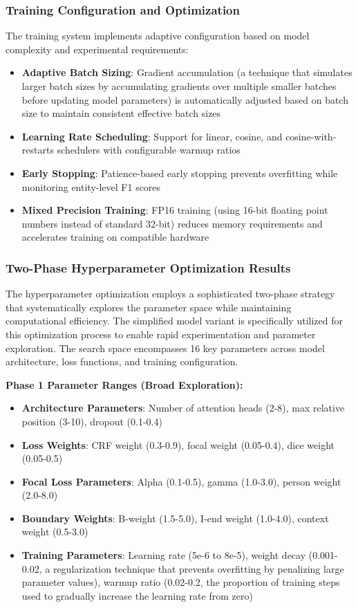 \documentclass[a4paper]{usiinfbachelorproject}
\begin{document}
\subsubsection{Training Configuration and Optimization}

The training system implements adaptive configuration based on model complexity and experimental requirements:

\begin{itemize}
    \item \textbf{Adaptive Batch Sizing}: Gradient accumulation (a technique that simulates larger batch sizes by accumulating gradients over multiple smaller batches before updating model parameters) is automatically adjusted based on batch size to maintain consistent effective batch sizes
    \item \textbf{Learning Rate Scheduling}: Support for linear, cosine, and cosine-with-restarts schedulers with configurable warmup ratios
    \item \textbf{Early Stopping}: Patience-based early stopping prevents overfitting while monitoring entity-level F1 scores
    \item \textbf{Mixed Precision Training}: FP16 training (using 16-bit floating point numbers instead of standard 32-bit) reduces memory requirements and accelerates training on compatible hardware
\end{itemize}
\subsubsection{Two-Phase Hyperparameter Optimization Results}

The hyperparameter optimization employs a sophisticated two-phase strategy that systematically explores the parameter space while maintaining computational efficiency. The simplified model variant is specifically utilized for this optimization process to enable rapid experimentation and parameter exploration. The search space encompasses 16 key parameters across model architecture, loss functions, and training configuration.

\textbf{Phase 1 Parameter Ranges (Broad Exploration):}
\begin{itemize}
    \item \textbf{Architecture Parameters}: Number of attention heads (2-8), max relative position (3-10), dropout (0.1-0.4)
    \item \textbf{Loss Weights}: CRF weight (0.3-0.9), focal weight (0.05-0.4), dice weight (0.05-0.5)
    \item \textbf{Focal Loss Parameters}: Alpha (0.1-0.5), gamma (1.0-3.0), person weight (2.0-8.0)
    \item \textbf{Boundary Weights}: B-weight (1.5-5.0), I-end weight (1.0-4.0), context weight (0.5-3.0)
    \item \textbf{Training Parameters}: Learning rate (5e-6 to 8e-5), weight decay (0.001-0.02, a regularization technique that prevents overfitting by penalizing large parameter values), warmup ratio (0.02-0.2, the proportion of training steps used to gradually increase the learning rate from zero)
\end{itemize}
\end{document}
